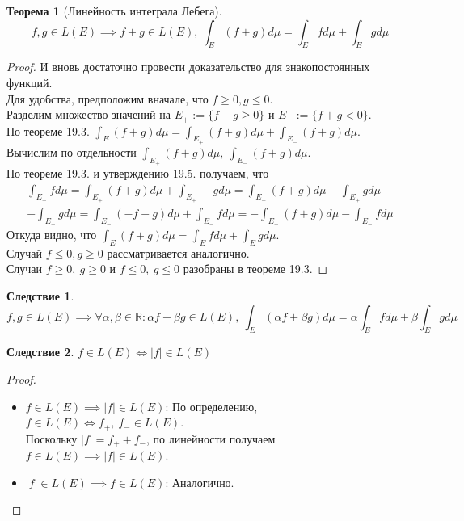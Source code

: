 \documentclass[11pt,a4paper]{report}
\def\Real{\mathbb{R}}
\theoremstyle{definition}
\theoremstyle{definition}
\newtheorem{theorem}{Теорема}[section]
\newtheorem{corollary}{Следствие}[section]
\theoremstyle{definition}
\begin{document}
		\begin{theorem}[Линейность интеграла Лебега]
			\[ f, g \in L(E) \implies f + g \in L(E),\ \int_{E} (f + g) d\mu = \int_{E} f d\mu + \int_{E} g d\mu \]
		\end{theorem}
		\begin{proof}
			И вновь достаточно провести доказательство для знакопостоянных функций.\\
			Для удобства, предположим вначале, что $ f \ge 0, g \le 0 $.\\ 
			Разделим множество значений на $ E_{+} := \{ f + g \ge 0 \} $ и $ E_{-} := \{ f + g < 0 \} $.\\
			По теореме 19.3. $ \int_{E} (f + g) d\mu = \int_{E_{+}} (f + g) d\mu + \int_{E_{-}} (f + g) d\mu $.\\
			Вычислим по отдельности $ \int_{E_{+}} (f + g) d\mu,\ \int_{E_{-}} (f + g) d\mu $.\\
			По теореме 19.3. и утверждению 19.5. получаем, что 
			\begin{gather*}
				\int_{E_{+}} f d \mu = \int_{E_{+}} (f + g) d\mu + \int_{E_{+}} -g d\mu = \int_{E_{+}} (f + g) d\mu - \int_{E_{+}} g d\mu\\
				-\int_{E_{-}} g d \mu = \int_{E_{-}} (-f - g) d\mu + \int_{E_{-}} f d\mu = -\int_{E_{-}} (f + g) d\mu - \int_{E_{-}} f d\mu
			\end{gather*}
			Откуда видно, что $ \int_{E} (f + g) d\mu = \int_{E} f d\mu + \int_{E} g d\mu $.\\
			Случай $ f \le 0, g \ge 0 $ рассматривается аналогично.\\
			Случаи $ f \ge 0,\ g \ge 0 $ и $ f \le 0,\ g \le 0 $ разобраны в теореме 19.3.
		\end{proof}
		\begin{corollary}
			\[ f, g \in L(E) \implies \forall \alpha, \beta \in \Real: \alpha f + \beta g \in L(E),\ \int_{E} (\alpha f + \beta g) d\mu = \alpha \int_{E} f d\mu + \beta \int_{E} g d\mu \]
		\end{corollary}
		\begin{corollary}
			$ f \in L(E) \iff |f| \in L(E) $
		\end{corollary}
		\begin{proof}$  $
			\begin{itemize}
				\item $ f \in L(E) \implies |f| \in L(E) $:
				По определению, $ f \in L(E) \iff f_{+},\ f_{-} \in L(E) $.\\
				Поскольку $ |f| = f_{+} + f_{-} $, по линейности получаем $ f \in L(E) \implies |f| \in L(E) $.
				\item $ |f| \in L(E) \implies f \in L(E) $: 
				Аналогично.
			\end{itemize}
		\end{proof}
\end{document}
